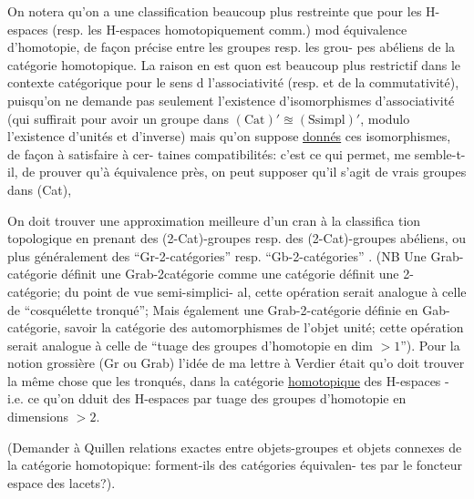 On notera qu'on a une  classification beaucoup plus restreinte
que pour les H-espaces (resp. les H-espaces homotopiquement comm.) mod
équivalence d'homotopie, de façon précise entre les groupes resp. les grou-
pes abéliens de la catégorie homotopique. La raison en est quon est beaucoup
plus restrictif dans le contexte catégorique pour le sens d l'associativité
(resp. et de la commutativité), puisqu'on ne demande pas seulement
l'existence d'isomorphismes d'associativité\deleted{,} (qui suffirait pour avoir un
groupe dans  $(\mathrm{Cat})' \approxeq (\mathrm{Ssimpl})'$, modulo l'existence d'unités et d'inverse)
mais qu'on suppose \uline{donnés} ces isomorphismes, de façon à satisfaire à cer-
taines compatibilités: c'est ce qui permet, me semble-t-il, de prouver qu'à
 \margin{(} équivalence près, on peut supposer qu'il s'agit de vrais groupes dans
(Cat), 



On doit trouver une approximation meilleure d'un cran à la classifica
tion topologique en prenant des (2-Cat)-groupes resp. des (2-Cat)-groupes
abéliens, ou plus généralement des ``Gr-2-catégories'' resp.
``Gb-2-catégories'' . (NB Une Grab-catégorie définit une Grab-2catégorie
comme une catégorie définit une 2-catégorie; du point de vue semi-simplici-
al, cette opération serait analogue à celle de ``cosquélette tronqué'';
Mais également une Grab-2-catégorie définie en Gab-catégorie, savoir la
catégorie des automorphismes de l'objet unité; cette  opération serait
analogue à celle de ``tuage des groupes d'homotopie en dim $>1$''). Pour la
notion grossière (Gr ou Grab) l'idée de ma lettre à Verdier était qu'o
doit trouver la même chose que les tronqués, dans la catégorie \uline{homotopique}
des H-espaces - i.e. ce qu'on dduit des H-espaces par tuage des groupes
d'homotopie en dimensions $>2$.

(Demander à Quillen relations exactes entre o\deleted{\unsure{-}}bjets-groupes et objets
 connexes de la catégorie homotopique: forment-ils des catégories équivalen-
tes par le foncteur espace des lacets?).

